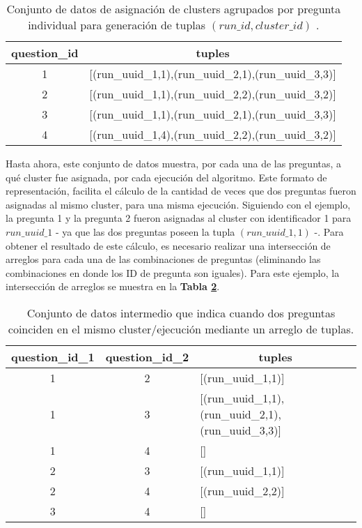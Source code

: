 \begin{table}[]
	\centering
	\begin{tabular}{|c|c|}
		\hline
		\textbf{question\_id} & \textbf{tuples}                                          \\ \hline
		1                     & {[}(run\_uuid\_1,1),(run\_uuid\_2,1),(run\_uuid\_3,3){]} \\ \hline
		2                     & {[}(run\_uuid\_1,1),(run\_uuid\_2,2),(run\_uuid\_3,2){]} \\ \hline
		3                     & {[}(run\_uuid\_1,1),(run\_uuid\_2,1),(run\_uuid\_3,3){]} \\ \hline
		4                     & {[}(run\_uuid\_1,4),(run\_uuid\_2,2),(run\_uuid\_3,2){]} \\ \hline
	\end{tabular}
	\caption{Conjunto de datos de asignación de clusters agrupados por pregunta individual para generación de tuplas \((run\_id, cluster\_id)\) .}
	\label{tab:tuplas}
\end{table}

Hasta ahora, este conjunto de datos muestra, por cada una de las preguntas, a qué cluster fue asignada, por cada ejecución del algoritmo. Este formato de representación, facilita el cálculo de la cantidad de veces que dos preguntas fueron asignadas al mismo cluster, para una misma ejecución. Siguiendo con el ejemplo, la pregunta 1 y la pregunta 2 fueron asignadas al cluster con identificador 1 para \(run\_uuid\_1\) - ya que las dos preguntas poseen la tupla \((run\_uuid\_1,1)\) -. Para obtener el resultado de este cálculo, es necesario realizar una intersección de arreglos para cada una de las combinaciones de preguntas (eliminando las combinaciones en donde los ID de pregunta son iguales). Para este ejemplo, la intersección de arreglos se muestra en la \textbf{Tabla \ref{tab:interseccion}}.

\begin{table}[]
	\centering
	\begin{tabular}{|c|c|l|}
		\hline
		\textbf{question\_id\_1} & \textbf{question\_id\_2} & \multicolumn{1}{c|}{\textbf{tuples}}                     \\ \hline
		1 & 2 & {[}(run\_uuid\_1,1){]} \\ \hline
		1                        & 3                        & {[}(run\_uuid\_1,1),(run\_uuid\_2,1),(run\_uuid\_3,3){]} \\ \hline
		1 & 4 & {[}{]}                 \\ \hline
		2 & 3 & {[}(run\_uuid\_1,1){]} \\ \hline
		2 & 4 & {[}(run\_uuid\_2,2){]} \\ \hline
		3 & 4 & {[}{]}                 \\ \hline
	\end{tabular}
	\caption{Conjunto de datos intermedio que indica cuando dos preguntas coinciden en el mismo cluster/ejecución mediante un arreglo de tuplas.}
	\label{tab:interseccion}
\end{table}

